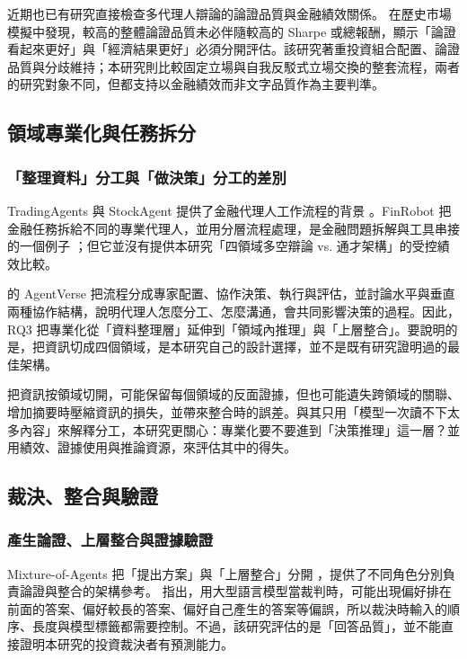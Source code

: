 \documentclass[12pt,a4paper]{article}
\numberwithin{table}{section}
\numberwithin{figure}{section}
\begin{document}
近期也已有研究直接檢查多代理人辯論的論證品質與金融績效關係。\citet{huang2026explainabletrading} 在歷史市場模擬中發現，較高的整體論證品質未必伴隨較高的 Sharpe 或總報酬，顯示「論證看起來更好」與「經濟結果更好」必須分開評估。該研究著重投資組合配置、論證品質與分歧維持；本研究則比較固定立場與自我反駁式立場交換的整套流程，兩者的研究對象不同，但都支持以金融績效而非文字品質作為主要判準。
\subsection{領域專業化與任務拆分}

\subsubsection{「整理資料」分工與「做決策」分工的差別}
TradingAgents 與 StockAgent 提供了金融代理人工作流程的背景 \citep{xiao2024tradingagents,zhang2024stockagent}。FinRobot 把金融任務拆給不同的專業代理人，並用分層流程處理，是金融問題拆解與工具串接的一個例子 \citep{yang2024finrobot}；但它並沒有提供本研究「四領域多空辯論 vs. 通才架構」的受控績效比較。

\citet{chen2023agentverse} 的 AgentVerse 把流程分成專家配置、協作決策、執行與評估，並討論水平與垂直兩種協作結構，說明代理人怎麼分工、怎麼溝通，會共同影響決策的過程。因此，RQ3 把專業化從「資料整理層」延伸到「領域內推理」與「上層整合」。要說明的是，把資訊切成四個領域，是本研究自己的設計選擇，並不是既有研究證明過的最佳架構。

把資訊按領域切開，可能保留每個領域的反面證據，但也可能遺失跨領域的關聯、增加摘要時壓縮資訊的損失，並帶來整合時的誤差。與其只用「模型一次讀不下太多內容」來解釋分工，本研究更關心：專業化要不要進到「決策推理」這一層？並用績效、證據使用與推論資源，來評估其中的得失。

\subsection{裁決、整合與驗證}
\subsubsection{產生論證、上層整合與證據驗證}
Mixture-of-Agents 把「提出方案」與「上層整合」分開 \citep{wang2024moa}，提供了不同角色分別負責論證與整合的架構參考。\citet{zheng2023judge} 指出，用大型語言模型當裁判時，可能出現偏好排在前面的答案、偏好較長的答案、偏好自己產生的答案等偏誤，所以裁決時輸入的順序、長度與模型標籤都需要控制。不過，該研究評估的是「回答品質」，並不能直接證明本研究的投資裁決者有預測能力。
\end{document}
